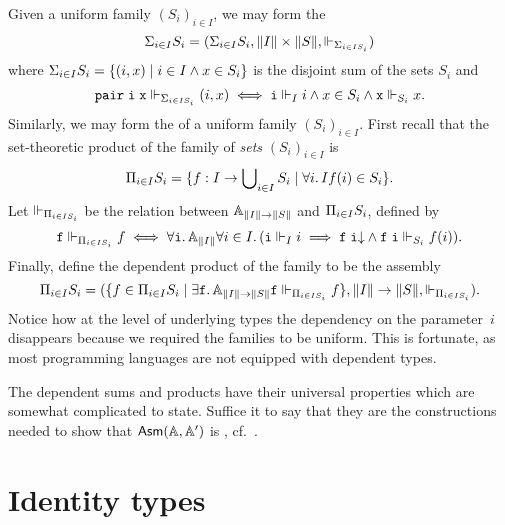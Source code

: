 Given a uniform family $(S_i)_{i \in I}$, we may form the
%
\begin{equation*}
  \dsum_{i \in I} S_i =
  (\dsum_{i \in I} S_i, \T{I} \times \T{S}, \rz[\dsum_{i \in I S_i}])
\end{equation*}
%
where $\dsum_{i \in I} S_i = \set{(i,x) \such i \in I \land x \in
  S_i}$ is the disjoint sum of the sets $S_i$ and
%
\begin{equation*}
  \combPair\;\R{i}\;\R{x} \rz[\dsum_{i \in I S_i}] (i, x)
  \iff
  \R{i} \rz[I] i
  \land
  x \in S_i
  \land
  \R{x} \rz[S_i] x.  
\end{equation*}
%
Similarly, we may form the  of a uniform
family $(S_i)_{i \in I}$. First recall that the
set-theoretic product of the family of \emph{sets} $(S_i)_{i \in I}$
is
%
\begin{equation*}
  \dprod_{i \in I} S_i =
  \set{f : I \to \tbigcup_{i \in I} S_i \such
    \all{i}{I}{f(i) \in S_i}
  }.
\end{equation*}
%
Let $\rz[\dprod_{i \in I S_i}]$ be the relation between $\Atyp{\T{I}
  \to \T{S}}$ and $\dprod_{i \in I} S_i$, defined by
%
\begin{equation*}
  \R{f} \rz[\dprod_{i \in I S_i}] f
  \iff
  \all{\R{i}}{\Atyp{\T{I}}}{
    \all{i \in I}
      (\R{i} \rz[I] i
      \implies
      \defined{\R{f}\;\R{i}} \land
      \R{f}\;\R{i} \rz[S_i] f(i))
  }.
\end{equation*}
%
Finally, define the dependent product of the family to be the assembly
%
\begin{equation*}
  \dprod_{i \in I} S_i =
  (\set{f \in \dprod_{i \in I} S_i \such
    \some{\R{f}}{\Atyp{\T{I} \to \T{S}}}{\R{f} \rz[\dprod_{i \in I S_i}]
      f}},
  \T{I} \to \T{S}, {\rz[\dprod_{i \in I S_i}]}).
\end{equation*}
%
Notice how at the level of underlying types the dependency on the
parameter~$i$ disappears because we required the families to be
uniform. This is fortunate, as most programming languages are not
equipped with dependent types.

The dependent sums and products have their universal properties which
are somewhat complicated to state. Suffice it to say that they are the
constructions needed to show that $\AsmA$ is , cf.\ .

\section{Identity types}
\label{sec:identity-types}

